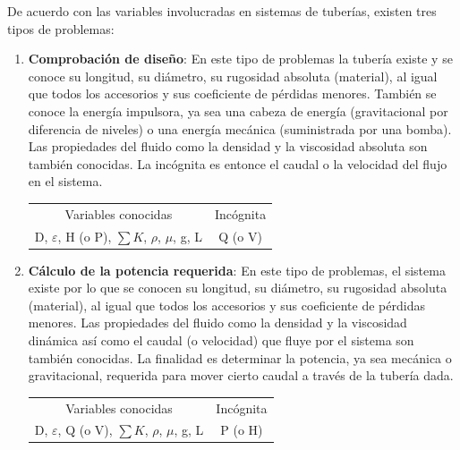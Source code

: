 \documentclass[10pt, oneside]{article}
\begin{document}
De acuerdo con las variables involucradas en sistemas de tuber\'ias, existen tres tipos de problemas:
\begin{enumerate}
\item \textbf{Comprobaci\'on de dise\~no}: En este tipo de problemas la tuber\'ia existe y se conoce su longitud, su di\'ametro, su rugosidad absoluta (material), al igual que todos los accesorios y sus coeficiente de p\'erdidas menores. Tambi\'en se conoce la energ\'ia impulsora, ya sea una cabeza de energ\'ia (gravitacional por diferencia de niveles) o una energ\'ia mec\'anica (suministrada por una bomba). Las propiedades del fluido como la densidad y la viscosidad absoluta son tambi\'en conocidas. La inc\'ognita es entonce el caudal o la velocidad del flujo en el sistema.
\begin{table}[h!]
\centering
\begin{tabular}{c c}
 \hline
 Variables conocidas & Inc\'ognita \\ [0.5ex]
D, $\varepsilon$, H (o P), $\sum K$, $\rho$, $\mu$, g, L & Q (o V) \\
\hline
\end{tabular}
\end{table}
 
\item \textbf{C\'alculo de la potencia requerida}: En este tipo de problemas, el sistema existe por lo que se conocen su longitud, su di\'ametro, su rugosidad absoluta (material), al igual que todos los accesorios y sus coeficiente de p\'erdidas menores. Las propiedades del fluido como la densidad y la viscosidad din\'amica as\'i como el caudal (o velocidad) que fluye por el sistema son tambi\'en conocidas. La finalidad es determinar la potencia, ya sea mec\'anica o gravitacional, requerida para mover cierto caudal a trav\'es de la tuber\'ia dada. 

\begin{table}[h!]
\centering
\begin{tabular}{c c}
 \hline
 Variables conocidas & Inc\'ognita \\ [0.5ex]
D, $\varepsilon$, Q (o V), $\sum K$, $\rho$, $\mu$, g, L & P (o H) \\
\hline
\end{tabular}
\end{table}
 

\end{enumerate}
\end{document}
